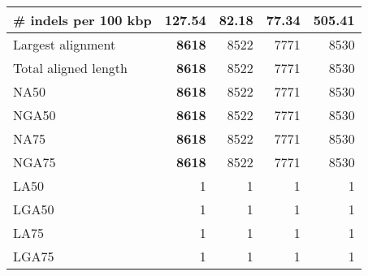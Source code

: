 \documentclass[12pt,a4paper]{article}
\begin{document}
\begin{table}[ht]
\begin{center}
\begin{tabular}{|l*{4}{|r}|}
\# indels per 100 kbp & 127.54 & 82.18 & {\bf 77.34} & 505.41 \\ \hline
Largest alignment & {\bf 8618} & 8522 & 7771 & 8530 \\ \hline
Total aligned length & {\bf 8618} & 8522 & 7771 & 8530 \\ \hline
NA50 & {\bf 8618} & 8522 & 7771 & 8530 \\ \hline
NGA50 & {\bf 8618} & 8522 & 7771 & 8530 \\ \hline
NA75 & {\bf 8618} & 8522 & 7771 & 8530 \\ \hline
NGA75 & {\bf 8618} & 8522 & 7771 & 8530 \\ \hline
LA50 & 1 & 1 & 1 & 1 \\ \hline
LGA50 & 1 & 1 & 1 & 1 \\ \hline
LA75 & 1 & 1 & 1 & 1 \\ \hline
LGA75 & 1 & 1 & 1 & 1 \\ \hline
\end{tabular}
\end{center}
\end{table}
\end{document}

